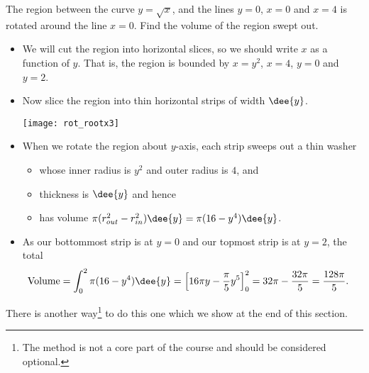 \begin{eg}\label{eg rot yaxis}
The region between the curve $y=\sqrt{x}$, and the lines $y=0$, $x=0$ and $x=4$
is rotated around the line $x=0$. Find the volume of the region swept out.

\soln
\begin{itemize}
 \item We will cut the region into horizontal slices, so we should write $x$ as a
function of $y$. That is, the region is bounded by $x=y^2$, $x=4$, $y=0$ and $y=2$.
 \item Now slice the region into thin horizontal strips of width $\dee{y}$.
\begin{wfig}
 \centering
\texttt{[image: rot\_rootx3]}
\end{wfig}

\item When we rotate the region about $y$-axis, each strip sweeps out a thin
washer
\begin{itemize}
\item whose inner radius is $y^2$ and outer radius is $4$, and
\item thickness is $\dee{y}$ and hence
\item has volume $\pi(r_{out}^2 - r_{in}^2)\dee{y} = \pi(16-y^4)\dee{y}$.
\end{itemize}
\item As our bottommost strip is at $y=0$ and our topmost
strip is at $y=2$, the total
\begin{align*}
\text{Volume}
&= \int _0^2 \pi(16-y^4) \dee{y}
=\left[16\pi y - \frac{\pi}{5}y^5 \right]_0^2
= 32\pi - \frac{32\pi}{5} = \frac{128\pi}{5}.
\end{align*}
\end{itemize}
\end{eg}
There is another way\footnote{The method is not a core part of the course and should be
considered optional.} to do this one which we show at the end of this section.


